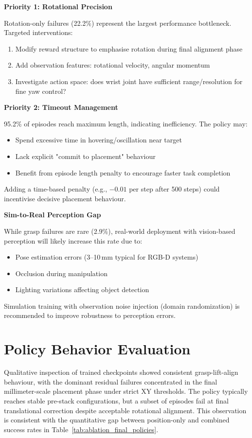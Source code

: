 \documentclass[12pt,a4paper,oneside]{report}
\begin{document}
\textbf{Priority 1: Rotational Precision}

Rotation-only failures (22.2\%) represent the largest performance bottleneck. Targeted interventions:
\begin{enumerate}
    \item Modify reward structure to emphasise rotation during final alignment phase
    \item Add observation features: rotational velocity, angular momentum
    \item Investigate action space: does wrist joint have sufficient range/resolution for fine yaw control?
\end{enumerate}

\textbf{Priority 2: Timeout Management}

95.2\% of episodes reach maximum length, indicating inefficiency. The policy may:
\begin{itemize}
    \item Spend excessive time in hovering/oscillation near target
    \item Lack explicit "commit to placement" behaviour
    \item Benefit from episode length penalty to encourage faster task completion
\end{itemize}

Adding a time-based penalty (e.g., $-0.01$ per step after 500 steps) could incentivise decisive placement behaviour.

\textbf{Sim-to-Real Perception Gap}

While grasp failures are rare (2.9\%), real-world deployment with vision-based perception will likely increase this rate due to:
\begin{itemize}
    \item Pose estimation errors (3--10\,mm typical for RGB-D systems)
    \item Occlusion during manipulation
    \item Lighting variations affecting object detection
\end{itemize}

Simulation training with observation noise injection (domain randomization) is recommended to improve robustness to perception errors.

\section{Policy Behavior Evaluation}
Qualitative inspection of trained checkpoints showed consistent grasp-lift-align behaviour, with the dominant residual failures concentrated in the final millimeter-scale placement phase under strict XY thresholds. The policy typically reaches stable pre-stack configurations, but a subset of episodes fail at final translational correction despite acceptable rotational alignment. This observation is consistent with the quantitative gap between position-only and combined success rates in Table~\ref{tab:ablation_final_policies}.
\end{document}
